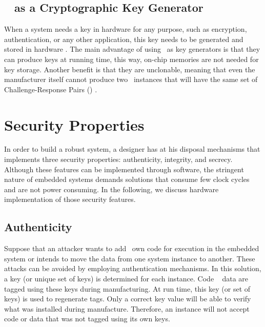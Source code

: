\subsection{\puf~ as a Cryptographic  Key Generator }
When a system needs a key in hardware for any purpose, such as encryption, authentication, or any other application, this key needs to be generated and stored in hardware \cite{puf-key-devadas-1278484}. The main advantage of using \pufs~as key generators is that they can produce keys at running time, this way, on-chip memories are not needed for key storage. Another benefit is that they are unclonable, meaning that even the manufacturer itself cannot produce two \puf~instances that will have the same set of Challenge-Response Pairs (\crps) \cite{Gassend2002:PUFs}.


\section{Security Properties}
\label{sec:securityproperties}
In order to build a robust system, a designer has at his disposal mechanisms that implements three security properties: authenticity, integrity, and secrecy. Although these features can be implemented through software, the stringent nature of embedded systems demands solutions that consume few clock cycles and are not power consuming.
In the following, we discuss hardware implementation of those security features.

\subsection{Authenticity}
\label{subsec:Authenticity}
Suppose that an attacker wants to add \hisher~own code for execution in the embedded system or intends to move the data from one system instance to another. These attacks can be avoided by employing authentication mechanisms. In this solution, a key (or unique set of keys) is determined for each instance.
Code \andor~ data are tagged using these keys during manufacturing.  At run time, this key (or set of keys) is used to regenerate tags. Only a correct key value will be able to verify what was installed during manufacture. Therefore, an instance will not accept code or data that was not tagged using its own keys.

